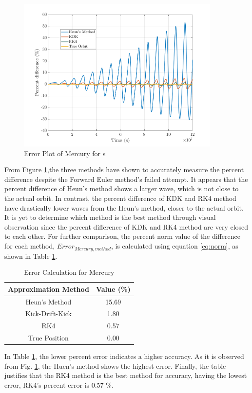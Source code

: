 \documentclass[conf]{new-aiaa}
\begin{document}
\begin{figure}[H]
    \centering
    \includegraphics[width=0.9\textwidth]{Figures/Implementation/Mercury.png}
    \caption{Error Plot of Mercury for  s}
    \label{fig:accuracy}
\end{figure}
    From Figure \ref{fig:accuracy},the three methods have shown to accurately measure the percent difference despite the Forward Euler method's failed attempt. It appears that the percent difference of Heun's method shows a larger wave, which is not close to the actual orbit. In contrast, the percent difference of KDK and RK4 method have drastically lower waves from the Heun's method, closer to the actual orbit. It is yet to determine which method is the best method through visual observation since the percent difference of KDK and RK4 method are very closed to each other. For further comparison, the percent norm value of the difference for each method, $Error_{Mercury, method }$, is calculated using equation \eqref{eq:norm}, as shown in Table \ref{tab:accuracy}.
    \begin{table}[H]
        \centering
        \caption{Error Calculation for Mercury}
        \begin{tabular}{c|c}
            \textbf{Approximation Method} & \textbf{Value (\%)} \\\hline\hline
             Heun's Method & 15.69\\
            Kick-Drift-Kick & 1.80\\
            RK4 & 0.57\\
            True Position& 0.00\\
        \end{tabular}
        \label{tab:accuracy}
    \end{table}
    In Table \ref{tab:accuracy}, the lower percent error indicates a higher accuracy. As it is observed from Fig. \ref{fig:accuracy}, the Huen's method shows the highest error. Finally, the table justifies that the RK4 method is the best method for accuracy, having the lowest error, RK4's percent error is 0.57 $\%$. 
\end{document}
